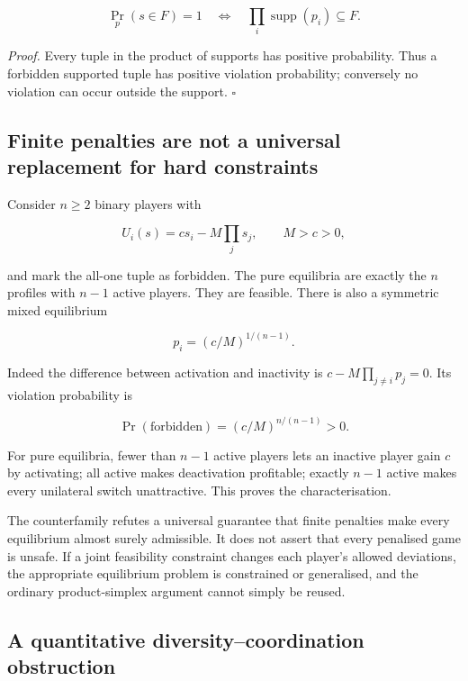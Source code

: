 \documentclass[11pt,a4paper]{article}
\begin{document}
\[
\Pr_p(s\in F)=1
\quad\Longleftrightarrow\quad
\prod_i\operatorname{supp}(p_i)\subseteq F.
\]

\emph{Proof.} Every tuple in the product of supports has positive
probability. Thus a forbidden supported tuple has positive violation
probability; conversely no violation can occur outside the support.
\(\square\)

\subsection{Finite penalties are not a universal replacement for hard
constraints}\label{finite-penalties-are-not-a-universal-replacement-for-hard-constraints}

Consider \(n\ge2\) binary players with

\nopagebreak[4]

\[
U_i(s)=c s_i-M\prod_j s_j,\qquad M>c>0,
\]

and mark the all-one tuple as forbidden. The pure equilibria are exactly
the \(n\) profiles with \(n-1\) active players. They are feasible. There
is also a symmetric mixed equilibrium

\nopagebreak[4]

\[
p_i=(c/M)^{1/(n-1)}.
\]

Indeed the difference between activation and inactivity is
\(c-M\prod_{j\ne i}p_j=0\). Its violation probability is

\nopagebreak[4]

\[
\boxed{\Pr(\text{forbidden})=(c/M)^{n/(n-1)}>0.}
\]

For pure equilibria, fewer than \(n-1\) active players lets an inactive
player gain \(c\) by activating; all active makes deactivation
profitable; exactly \(n-1\) active makes every unilateral switch
unattractive. This proves the characterisation.

The counterfamily refutes a universal guarantee that finite penalties
make every equilibrium almost surely admissible. It does not assert that
every penalised game is unsafe. If a joint feasibility constraint
changes each player's allowed deviations, the appropriate equilibrium
problem is constrained or generalised, and the ordinary product-simplex
argument cannot simply be reused.

\subsection{A quantitative diversity--coordination
obstruction}\label{a-quantitative-diversitycoordination-obstruction}
\end{document}
